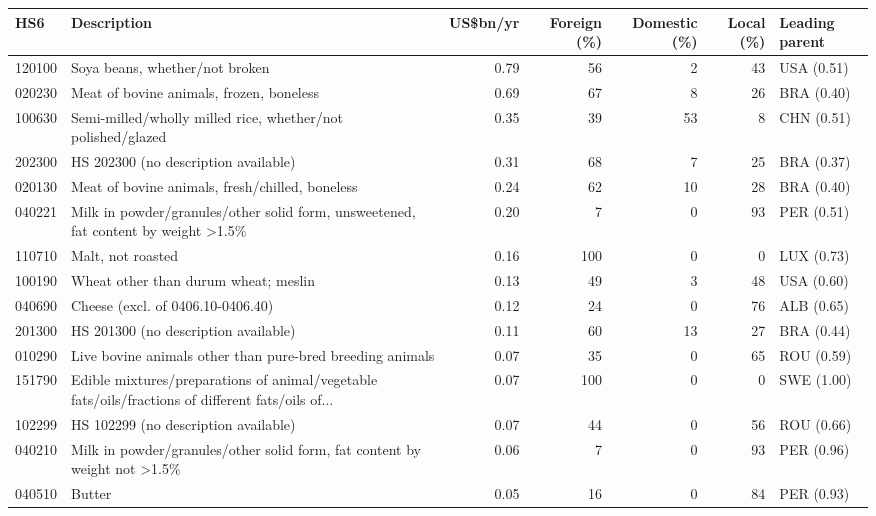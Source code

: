 \begin{tabular}{@{}l p{6.4cm} r r r r l@{}}
\toprule
HS6 & Description & US\$bn/yr & Foreign (\%) & Domestic (\%) & Local (\%) & Leading parent \\
\midrule
120100 & Soya beans, whether/\allowbreak{}not broken & 0.79 & 56 & 2 & 43 & USA (0.51) \\
020230 & Meat of bovine animals, frozen, boneless & 0.69 & 67 & 8 & 26 & BRA (0.40) \\
100630 & Semi-milled/\allowbreak{}wholly milled rice, whether/\allowbreak{}not polished/\allowbreak{}glazed & 0.35 & 39 & 53 & 8 & CHN (0.51) \\
202300 & HS 202300 (no description available) & 0.31 & 68 & 7 & 25 & BRA (0.37) \\
020130 & Meat of bovine animals, fresh/\allowbreak{}chilled, boneless & 0.24 & 62 & 10 & 28 & BRA (0.40) \\
040221 & Milk in powder/\allowbreak{}granules/\allowbreak{}other solid form, unsweetened, fat content by weight >1.5\% & 0.20 & 7 & 0 & 93 & PER (0.51) \\
110710 & Malt, not roasted & 0.16 & 100 & 0 & 0 & LUX (0.73) \\
100190 & Wheat other than durum wheat; meslin & 0.13 & 49 & 3 & 48 & USA (0.60) \\
040690 & Cheese (excl. of 0406.10-0406.40) & 0.12 & 24 & 0 & 76 & ALB (0.65) \\
201300 & HS 201300 (no description available) & 0.11 & 60 & 13 & 27 & BRA (0.44) \\
010290 & Live bovine animals other than pure-bred breeding animals & 0.07 & 35 & 0 & 65 & ROU (0.59) \\
151790 & Edible mixtures/\allowbreak{}preparations of animal/\allowbreak{}vegetable fats/\allowbreak{}oils/\allowbreak{}fractions of different fats/\allowbreak{}oils of... & 0.07 & 100 & 0 & 0 & SWE (1.00) \\
102299 & HS 102299 (no description available) & 0.07 & 44 & 0 & 56 & ROU (0.66) \\
040210 & Milk in powder/\allowbreak{}granules/\allowbreak{}other solid form, fat content by weight not >1.5\% & 0.06 & 7 & 0 & 93 & PER (0.96) \\
040510 & Butter & 0.05 & 16 & 0 & 84 & PER (0.93) \\
\bottomrule
\end{tabular}
